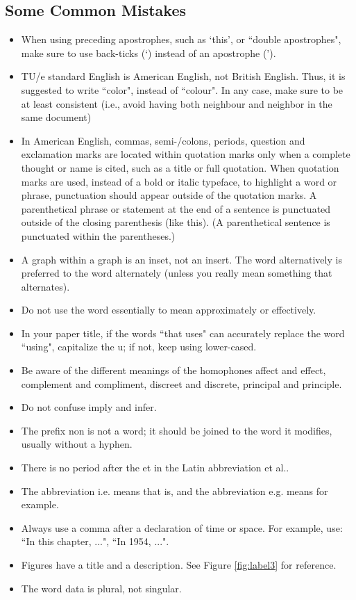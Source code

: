 \documentclass[11pt]{report}
\numberwithin{equation}{chapter}		%
\numberwithin{figure}{chapter}			%
\numberwithin{table}{chapter}			%
\begin{document}
\subsection{Some Common Mistakes}
\begin{itemize}
\item When using preceding apostrophes, such as `this', or ``double apostrophes", make sure to use back-ticks (`) instead of an apostrophe (').
\item TU/e standard English is American English, not British English. Thus, it is suggested to write ``color", instead of ``colour". In any case, make sure to be at least consistent (i.e., avoid having both neighbour and neighbor in the same document)
\item In American English, commas, semi-/colons, periods, question and exclamation marks are located within quotation marks only when a complete thought or name is cited, such as a title or full quotation. When quotation marks are used, instead of a bold or italic typeface, to highlight a word or phrase, punctuation should appear outside of the quotation marks. A parenthetical phrase or statement at the end of a sentence is punctuated outside of the closing parenthesis (like this). (A parenthetical sentence is punctuated within the parentheses.)
\item A graph within a graph is an inset, not an insert. The word alternatively is preferred to the word alternately (unless you really mean something that alternates).
\item Do not use the word essentially to mean approximately or effectively.
\item In your paper title, if the words ``that uses" can accurately replace the word ``using", capitalize the u; if not, keep using lower-cased.
\item Be aware of the different meanings of the homophones affect and effect, complement and compliment, discreet and discrete, principal and principle.
\item Do not confuse imply and infer.
\item The prefix non is not a word; it should be joined to the word it modifies, usually without a hyphen.
\item There is no period after the et in the Latin abbreviation et al..
\item The abbreviation i.e. means that is, and the abbreviation e.g. means for example.
\item Always use a comma after a declaration of time or space. For example, use: ``In this chapter, ...", ``In 1954, ...". 
\item Figures have a title and a description. See Figure \ref{fig:label3} for reference. 
\item The word data is plural, not singular.

\end{itemize}
\end{document}
